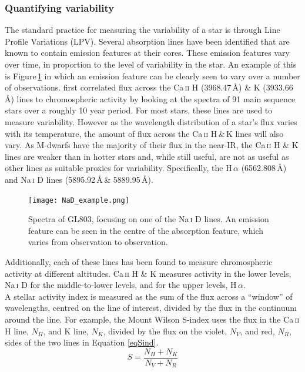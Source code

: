\subsubsection{Quantifying variability}
\label{SecVarMeth}
The standard practice for measuring the variability of a star is through Line Profile Variations (LPV). Several absorption lines have been identified that are known to contain emission features at their cores. These emission features vary over time, in proportion to the level of variability in the star. An example of this is Figure\,\ref{figNaD_line} in which an emission feature can be clearly seen to vary over a number of observations. \citealt{1978Wilson} first correlated flux across the Ca\,\textsc{ii} H (3968.47\,\AA) \& K (3933.66\,\AA) lines to chromospheric activity by looking at the spectra of 91 main sequence stars over a roughly 10 year period. For most stars, these lines are used to measure variability. However as the wavelength distribution of a star's flux varies with its temperature, the amount of flux across the Ca\,\textsc{ii} H\,\&\,K lines will also vary. As M-dwarfs have the majority of their flux in the near-IR, the Ca\,\textsc{ii} H \& K lines are weaker than in hotter stars and, while still useful, are not as useful as other lines as suitable proxies for variability. Specifically, the H\,\textsc{$\alpha$} (6562.808\,\AA) and Na\,\textsc{i} D lines (5895.92\,\AA\,\& 5889.95\,\AA).\\

\begin{figure}
    \centering
    \texttt{[image: NaD\_example.png]}
    \caption{Spectra of GL803, focusing on one of the Na\,\textsc{i} D lines. An emission feature can be seen in the centre of the absorption feature, which varies from observation to observation.}
    \label{figNaD_line}
\end{figure}

Additionally, each of these lines has been found to measure chromospheric activity at different altitudes. Ca\,\textsc{ii} H \& K measures activity in the lower levels, Na\,\textsc{i} D for the middle-to-lower levels, and for the upper levels, H\,\textsc{$\alpha$}.\\

A stellar activity index is measured as the sum of the flux across a ``window'' of wavelengths, centred on the line of interest, divided by the flux in the continuum around the line. For example, the Mount Wilson S-index \citep{1978Vaughan} uses the flux in the Ca\,\textsc{ii} H line, $N_H$, and K line, $N_K$, divided by the flux on the violet, $N_V$, and red, $N_R$, sides of the two lines in Equation \ref{eqSind}.
\begin{equation}
	S = \frac{N_H + N_K}{N_V + N_R}
	\label{eqSind}
\end{equation}


